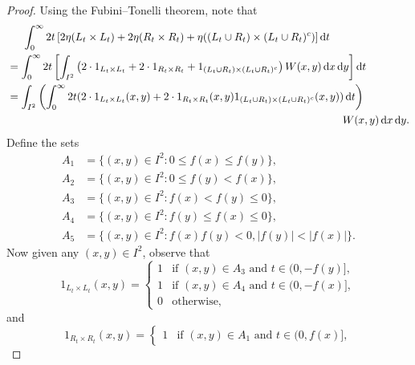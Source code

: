 \documentclass[12pt,a4paper,bold]{thesis}
\theoremstyle{definition}
\newcommand*{\abs}[1]{\left\vert #1 \right\vert}
\begin{document}
\begin{proof}
    Using the Fubini--Tonelli theorem, note that
    \begin{align*}
        & \hspace{0.51cm}
        \int_{0}^{\infty} 2t \left[2 \eta(L_t \times L_t) + 2 \eta(R_t \times R_t)
        + \eta((L_t \cup R_t) \times (L_t \cup R_t)^c)\right] \mathrm{d}t 
        \\
        & = 
        \int_{0}^{\infty} 2t \left[\int_{I^2} \left(2 \cdot 1_{L_t \times L_t}
        + 2 \cdot 1_{R_t \times R_t} + 1_{(L_t \cup R_t) \times (L_t \cup R_t)^c}\right) 
        W(x,y)\, \mathrm{d}x\, \mathrm{d}y\right] \mathrm{d}t
        \\
        & = 
        \int_{I^2} \left(\int_{0}^{\infty} 2t 
        (2 \cdot 1_{L_t \times L_t}(x,y) + 2 \cdot 1_{R_t \times R_t}(x,y) 
        1_{(L_t \cup R_t) \times (L_t \cup R_t)^c}(x,y))\, \mathrm{d}t\right)
        \\
        & \hspace{11cm}
        W(x,y)\, \mathrm{d}x\, \mathrm{d}y. 
    \end{align*}
    Define the sets
    \begin{align*}
        A_1 & = \{(x,y) \in I^2 : 0 \leq f(x) \leq f(y)\},
        \\
        A_2 & = \{(x,y) \in I^2 : 0 \leq f(y) < f(x)\},
        \\
        A_3 & = \{(x,y) \in I^2 : f(x) < f(y) \leq 0\},
        \\
        A_4 & = \{(x,y) \in I^2 : f(y) \leq f(x) \leq 0\},
        \\
        A_5 & = \{(x,y) \in I^2 : f(x)f(y) < 0, \abs{f(y)} < \abs{f(x)}\}.
    \end{align*}
    Now given any $(x,y) \in I^2$, observe that
    \begin{equation*}
        1_{L_t \times L_t}(x,y) =
        \begin{cases}
            1 & \text{if } (x,y) \in A_3 \text{ and } t \in (0, -f(y)],
            \\
            1 & \text{if } (x,y) \in A_4 \text{ and } t \in (0, -f(x)],
            \\
            0 & \text{otherwise,}
        \end{cases} 
    \end{equation*}
    and
    \begin{equation*}
        1_{R_t \times R_t}(x,y) =
        \begin{cases}
            1 & \text{if } (x,y) \in A_1 \text{ and } t \in (0, f(x)],

\end{cases}
\end{equation*}
\end{proof}
\end{document}
